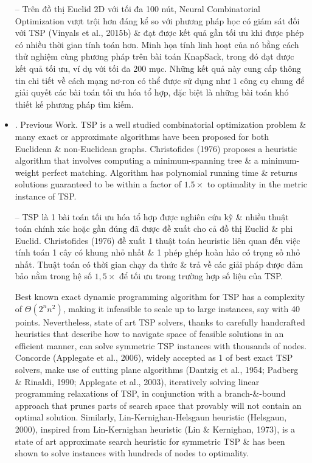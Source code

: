 \documentclass{article}
\begin{document}
\begin{itemize}
    -- Trên đồ thị Euclid 2D với tối đa 100 nút, Neural Combinatorial Optimization vượt trội hơn đáng kể so với phương pháp học có giám sát đối với TSP (Vinyals et al., 2015b) \& đạt được kết quả gần tối ưu khi được phép có nhiều thời gian tính toán hơn. Minh họa tính linh hoạt của nó bằng cách thử nghiệm cùng phương pháp trên bài toán KnapSack, trong đó đạt được kết quả tối ưu, ví dụ với tối đa 200 mục. Những kết quả này cung cấp thông tin chi tiết về cách mạng nơ-ron có thể được sử dụng như 1 công cụ chung để giải quyết các bài toán tối ưu hóa tổ hợp, đặc biệt là những bài toán khó thiết kế phương pháp tìm kiếm.
    \item {. Previous Work.} TSP is a well studied combinatorial optimization problem \& many exact or approximate algorithms have been proposed for both Euclidean \& non-Euclidean graphs. Christofides (1976) proposes a heuristic algorithm that involves computing a minimum-spanning tree \& a minimum-weight perfect matching. Algorithm has polynomial running time \& returns solutions guaranteed to be within a factor of $1.5\times$ to optimality in the metric instance of TSP.
    
    -- TSP là 1 bài toán tối ưu hóa tổ hợp được nghiên cứu kỹ \& nhiều thuật toán chính xác hoặc gần đúng đã được đề xuất cho cả đồ thị Euclid \& phi Euclid. Christofides (1976) đề xuất 1 thuật toán heuristic liên quan đến việc tính toán 1 cây có khung nhỏ nhất \& 1 phép ghép hoàn hảo có trọng số nhỏ nhất. Thuật toán có thời gian chạy đa thức \& trả về các giải pháp được đảm bảo nằm trong hệ số $1,5\times$ để tối ưu trong trường hợp số liệu của TSP.
    
    Best known exact dynamic programming algorithm for TSP has a complexity of $\Theta(2^nn^2)$, making it infeasible to scale up to large instances, say with 40 points. Nevertheless, state of art TSP solvers, thanks to carefully handcrafted heuristics that describe how to navigate space of feasible solutions in an efficient manner, can solve symmetric TSP instances with thousands of nodes. Concorde (Applegate et al., 2006), widely accepted as 1 of best exact TSP solvers, make use of cutting plane algorithms (Dantzig et al., 1954; Padberg \& Rinaldi, 1990; Applegate et al., 2003), iteratively solving linear programming relaxations of TSP, in conjunction with a branch-\&-bound approach that prunes parts of search space that provably will not contain an optimal solution. Similarly, Lin-Kernighan-Helsgaun heuristic (Helsgaun, 2000), inspired from Lin-Kernighan heuristic (Lin \& Kernighan, 1973), is a state of art approximate search heuristic for symmetric TSP \& has been shown to solve instances with hundreds of nodes to optimality.
    

\end{itemize}
\end{document}

